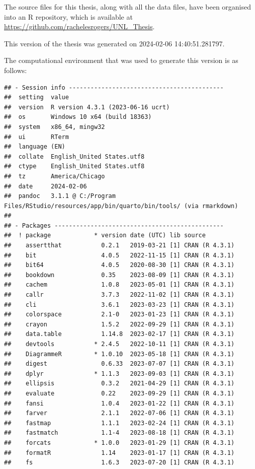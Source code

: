 \documentclass[print]{nuthesis}
\begin{document}
The source files for this thesis, along with all the data files, have been organised into an R repository, which is available at \url{https://github.com/rachelesrogers/UNL_Thesis}.

This version of the thesis was generated on 2024-02-06 14:40:51.281797.

The computational environment that was used to generate this version is as follows:

\begin{verbatim}
## - Session info -------------------------------------------
##  setting  value
##  version  R version 4.3.1 (2023-06-16 ucrt)
##  os       Windows 10 x64 (build 18363)
##  system   x86_64, mingw32
##  ui       RTerm
##  language (EN)
##  collate  English_United States.utf8
##  ctype    English_United States.utf8
##  tz       America/Chicago
##  date     2024-02-06
##  pandoc   3.1.1 @ C:/Program Files/RStudio/resources/app/bin/quarto/bin/tools/ (via rmarkdown)
## 
## - Packages -----------------------------------------------
##  ! package            * version date (UTC) lib source
##    assertthat           0.2.1   2019-03-21 [1] CRAN (R 4.3.1)
##    bit                  4.0.5   2022-11-15 [1] CRAN (R 4.3.1)
##    bit64                4.0.5   2020-08-30 [1] CRAN (R 4.3.1)
##    bookdown             0.35    2023-08-09 [1] CRAN (R 4.3.1)
##    cachem               1.0.8   2023-05-01 [1] CRAN (R 4.3.1)
##    callr                3.7.3   2022-11-02 [1] CRAN (R 4.3.1)
##    cli                  3.6.1   2023-03-23 [1] CRAN (R 4.3.1)
##    colorspace           2.1-0   2023-01-23 [1] CRAN (R 4.3.1)
##    crayon               1.5.2   2022-09-29 [1] CRAN (R 4.3.1)
##    data.table           1.14.8  2023-02-17 [1] CRAN (R 4.3.1)
##    devtools           * 2.4.5   2022-10-11 [1] CRAN (R 4.3.1)
##    DiagrammeR         * 1.0.10  2023-05-18 [1] CRAN (R 4.3.1)
##    digest               0.6.33  2023-07-07 [1] CRAN (R 4.3.1)
##    dplyr              * 1.1.3   2023-09-03 [1] CRAN (R 4.3.1)
##    ellipsis             0.3.2   2021-04-29 [1] CRAN (R 4.3.1)
##    evaluate             0.22    2023-09-29 [1] CRAN (R 4.3.1)
##    fansi                1.0.4   2023-01-22 [1] CRAN (R 4.3.1)
##    farver               2.1.1   2022-07-06 [1] CRAN (R 4.3.1)
##    fastmap              1.1.1   2023-02-24 [1] CRAN (R 4.3.1)
##    fastmatch            1.1-4   2023-08-18 [1] CRAN (R 4.3.1)
##    forcats            * 1.0.0   2023-01-29 [1] CRAN (R 4.3.1)
##    formatR              1.14    2023-01-17 [1] CRAN (R 4.3.1)
##    fs                   1.6.3   2023-07-20 [1] CRAN (R 4.3.1)

\end{verbatim}
\end{document}
